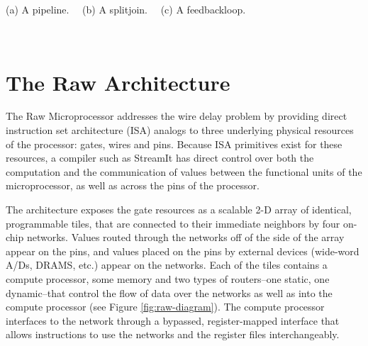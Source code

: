 \begin{figure*}[th]
\vspace{-12pt}
\begin{minipage}{3.2in}
\begin{center}
\begin{minipage}{0.46in}
\centering
{} \\
\end{minipage} 
~
\begin{minipage}{1.3in}
\centering
{} \\
\end{minipage}
~
\begin{minipage}{1.02in}
\centering
{} \\
\end{minipage} 
\\ ~ \\ {\protect\small (a) A pipeline. ~~(b) A splitjoin. ~~(c) A feedbackloop.}
\caption{Stream structures supported by StreamIt.
\protect\label{fig:structures}}
\end{center}
\end{minipage}
~~~~~
\begin{minipage}{3in}
\centering
\vspace{15pt}
\caption{Block diagram of the Raw architecture.
\protect\label{fig:raw-diagram}}
\end{minipage}
\vspace{-12pt}
\end{figure*}

\section{The Raw Architecture}
\label{sec:raw}

The Raw Microprocessor \cite{raw10,raw} addresses the wire delay
problem \cite{raw13} by providing direct instruction set architecture
(ISA) analogs to three underlying physical resources of the processor:
gates, wires and pins. Because ISA primitives exist for these
resources, a compiler such as StreamIt has direct control over both
the computation and the communication of values between the functional
units of the microprocessor, as well as across the pins of the
processor.

The architecture exposes the gate resources as a scalable 2-D array of
identical, programmable tiles, that are connected to their immediate
neighbors by four on-chip networks.  Values routed through the
networks off of the side of the array appear on the pins, and values
placed on the pins by external devices (wide-word A/Ds, DRAMS, etc.)
appear on the networks.  Each of the tiles contains a compute
processor, some memory and two types of routers--one static, one
dynamic--that control the flow of data over the networks as well as
into the compute processor (see Figure \ref{fig:raw-diagram}).  The
compute processor interfaces to the network through a bypassed,
register-mapped interface \cite{raw10} that allows instructions to use
the networks and the register files interchangeably.

